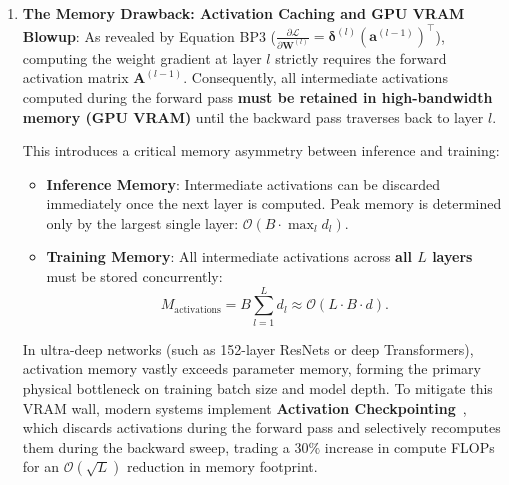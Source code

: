 \begin{enumerate}[noitemsep,topsep=2pt,parsep=0pt,partopsep=0pt]
  \item \textbf{The Memory Drawback: Activation Caching and GPU VRAM Blowup}:
  As revealed by Equation BP3 ($\frac{\partial \mathcal{L}}{\partial \mathbf{W}^{(l)}} = \boldsymbol{\delta}^{(l)} (\mathbf{a}^{(l-1)})^\top$), computing the weight gradient at layer $l$ strictly requires the forward activation matrix $\mathbf{A}^{(l-1)}$. Consequently, all intermediate activations computed during the forward pass \textbf{must be retained in high-bandwidth memory (GPU VRAM)} until the backward pass traverses back to layer $l$.
  
  This introduces a critical memory asymmetry between inference and training:
  \begin{itemize}[noitemsep,topsep=2pt,parsep=0pt,partopsep=0pt]
    \item \textbf{Inference Memory}: Intermediate activations can be discarded immediately once the next layer is computed. Peak memory is determined only by the largest single layer: $\mathcal{O}(B \cdot \max_l d_l)$.
    \item \textbf{Training Memory}: All intermediate activations across \textbf{all $L$ layers} must be stored concurrently:
    \begin{equation}
    M_{\text{activations}} = B \sum_{l=1}^L d_l \approx \mathcal{O}(L \cdot B \cdot d).
    \label{eq:activation_memory_scaling}
    \end{equation}
  \end{itemize}
  In ultra-deep networks (such as 152-layer ResNets or deep Transformers), activation memory vastly exceeds parameter memory, forming the primary physical bottleneck on training batch size and model depth. To mitigate this VRAM wall, modern systems implement \textbf{Activation Checkpointing}~\cite{chen2016training}, which discards activations during the forward pass and selectively recomputes them during the backward sweep, trading a $30\%$ increase in compute FLOPs for an $\mathcal{O}(\sqrt{L})$ reduction in memory footprint.
\end{enumerate}
